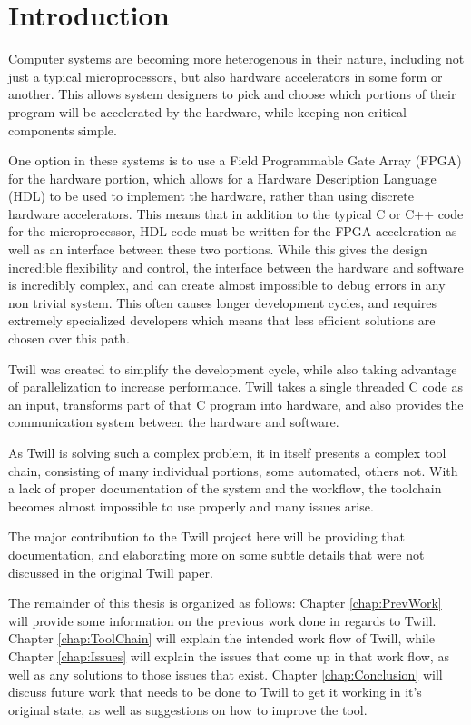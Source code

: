 \chapter{Introduction}
Computer systems are becoming more heterogenous in their nature, including not just a typical microprocessors, but also hardware accelerators in some form or another. This allows system designers to pick and choose which portions of their program will be accelerated by the hardware, while keeping non-critical components simple. 

One option in these systems is to use a Field Programmable Gate Array (FPGA) for the hardware portion, which allows for a Hardware Description Language (HDL) to be used to implement the hardware, rather than using discrete hardware accelerators. This means that in addition to the typical C or C++ code for the microprocessor, HDL code must be written for the FPGA acceleration as well as an interface between these two portions. While this gives the design incredible flexibility and control, the interface between the hardware and software is incredibly complex, and can create almost impossible to debug errors in any non trivial system. This often causes longer development cycles, and requires extremely specialized developers which means that less efficient solutions are chosen over this path.

Twill was created to simplify the development cycle, while also taking advantage of parallelization to increase performance. Twill takes a single threaded C code as an input, transforms part of that C program into hardware, and also provides the communication system between the hardware and software.

As Twill is solving such a complex problem, it in itself presents a complex tool chain, consisting of many individual portions, some automated, others not. With a lack of proper documentation of the system and the workflow, the toolchain becomes almost impossible to use properly and many issues arise.

The major contribution to the Twill project here will be providing that documentation, and elaborating more on some subtle details that were not discussed in the original Twill paper. 

The remainder of this thesis is organized as follows: Chapter \ref{chap:PrevWork} will provide some information on the previous work done in regards to Twill. Chapter \ref{chap:ToolChain} will explain the intended work flow of Twill, while Chapter \ref{chap:Issues} will explain the issues that come up in that work flow, as well as any solutions to those issues that exist. Chapter \ref{chap:Conclusion} will discuss future work that needs to be done to Twill to get it working in it's original state, as well as suggestions on how to improve the tool.